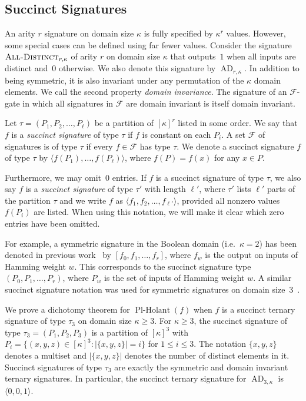 \documentclass[11pt]{article}
\newcommand{\PlHolant}{\operatorname{Pl-Holant}}
\newcommand{\AllDistinct}{\textsc{All-Distinct}}
\newcommand{\AD}{\operatorname{AD}}
\begin{document}
\subsection{Succinct Signatures} \label{subsec:succinct_signature}

An arity $r$ signature on domain size $\kappa$ is fully specified by $\kappa^r$ values.
However, some special cases can be defined using far fewer values.
Consider the signature $\AllDistinct_{r,\kappa}$ of arity $r$ on domain size $\kappa$ that outputs~$1$ when all inputs are distinct and~$0$ otherwise.
We also denote this signature by $\AD_{r,\kappa}$.
In addition to being symmetric,
it is also invariant under any permutation of the $\kappa$ domain elements.
We call the second property \emph{domain invariance}.
The signature of an $\mathcal{F}$-gate in which all signatures in $\mathcal{F}$ are domain invariant is itself domain invariant.

\begin{definition} \label{def:succinct_signature}
 Let $\tau = (P_1, P_2, \dotsc, P_\ell)$ be a partition of $[\kappa]^r$ listed in some order.
 We say that $f$ is a \emph{succinct signature} of type $\tau$ if $f$ is constant on each $P_i$.
 A set $\mathcal{F}$ of signatures is of type $\tau$ if every $f \in \mathcal{F}$ has type $\tau$.
 We denote a succinct signature $f$ of type $\tau$ by $\langle f(P_1), \dotsc, f(P_\ell) \rangle$,
 where $f(P) = f(x)$ for any $x \in P$.
 
 Furthermore, we may omit~$0$ entries.
 If $f$ is a succinct signature of type $\tau$,
 we also say $f$ is a \emph{succinct signature} of type $\tau'$ with length $\ell'$,
 where $\tau'$ lists $\ell'$ parts of the partition $\tau$
 and we write $f$ as $\langle f_1, f_2, \dotsc, f_{\ell'} \rangle$,
 provided all nonzero values $f(P_i)$ are listed.
 When using this notation,
 we will make it clear which zero entries have been omitted.
\end{definition}

For example,
a symmetric signature in the Boolean domain (i.e.~$\kappa = 2$) has been denoted in previous work~\cite{CGW13} by $[f_0, f_1, \dotsc, f_r]$,
where $f_w$ is the output on inputs of Hamming weight $w$.
This corresponds to the succinct signature type $(P_0, P_1, \dotsc, P_r)$,
where $P_w$ is the set of inputs of Hamming weight $w$.
A similar succinct signature notation was used for symmetric signatures on domain size~$3$~\cite[p.~1282]{CLX13}.

We prove a dichotomy theorem for $\PlHolant(f)$ when $f$ is a succinct ternary signature of type $\tau_3$ on domain size $\kappa \ge 3$.
For $\kappa \ge 3$,
the succinct signature of type $\tau_3 = (P_1, P_2, P_3)$ is a partition of $[\kappa]^3$ with $P_i = \{(x,y,z) \in [\kappa]^3 : |\{x, y, z\}| = i\}$ for $1 \le i \le 3$.
The notation $\{x, y, z\}$ denotes a multiset and $|\{x, y, z\}|$ denotes the number of distinct elements in it.
Succinct signatures of type $\tau_3$ are exactly the symmetric and domain invariant ternary signatures.
In particular,
the succinct ternary signature for $\AD_{3,\kappa}$ is $\langle 0,0,1 \rangle$.
\end{document}
